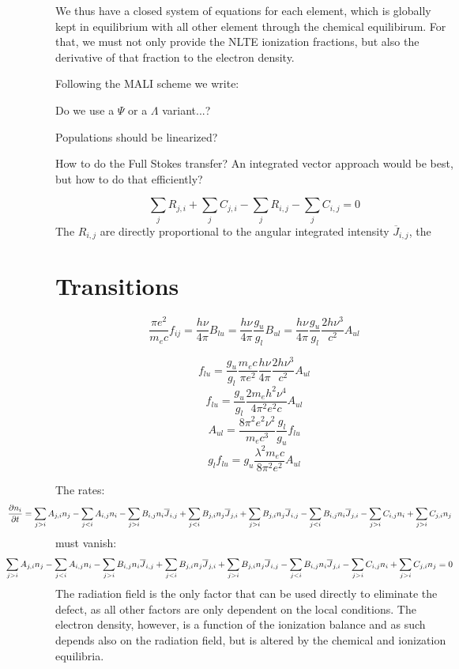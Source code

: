 \documentclass[a4paper]{article}
\begin{document}
We thus have a closed system of equations for each element, which is globally kept in equilibrium with all other element through the chemical equilibirum. For that, we must not only provide the NLTE ionization fractions, but also the derivative of that fraction to the electron density.

Following the MALI scheme we write:

Do we use a $\Psi$ or a $\Lambda$ variant...?

Populations should be linearized?

How to do the Full Stokes transfer? An integrated vector approach would be best, but how to do that efficiently?

$$
\sum_j R_{j,i} + \sum_j C_{j,i} - \sum_j R_{i,j} - \sum_j C_{i,j}=0
$$
The $R_{i,j}$ are directly proportional to the angular integrated intensity $\overline{J}_{i,j}$, the 

\section{Transitions}

$$
\frac{\pi e^2}{m_e c} f_{ij}=\frac{h\nu}{4\pi} B_{lu} = \frac{h\nu}{4\pi} \frac{g_u}{g_l}B_{ul} = \frac{h\nu}{4\pi} \frac{g_u}{g_l}  \frac{2 h\nu^3}{c^2} A_{ul} 
$$

$$
 f_{lu} =  \frac{g_u}{g_l} \frac{m_e c}{\pi e^2} \frac{h\nu}{4\pi} \frac{2 h\nu^3}{c^2} A_{ul} 
$$
$$
 f_{lu} =  \frac{g_u}{g_l} \frac{2 m_e h^2\nu^4}{4\pi^2 e^2 c} A_{ul} 
$$
$$
 A_{ul} =  \frac{8\pi^2 e^2 \nu^2}{m_e c^3} \frac{g_l}{g_u} f_{lu} 
$$
$$
 g_l f_{lu}  = g_u \frac{\lambda^2 m_e c}{8\pi^2 e^2} A_{ul}
$$

The rates:
$$
\hspace*{-2.00cm}\frac{\partial n_i}{\partial t}=\sum_{j > i} A_{j,i} n_j - \sum_{j < i} A_{i,j} n_i 
                              - \sum_{j > i} B_{i,j} n_i \overline{J}_{i,j} 
                              + \sum_{j < i} B_{j,i} n_j \overline{J}_{j,i} 
                              + \sum_{j > i} B_{j,i} n_j \overline{J}_{i,j} 
                              - \sum_{j < i} B_{i,j} n_i \overline{J}_{j,i} 
                              - \sum_{j > i} C_{i,j} n_i + \sum_{j > i} C_{j,i} n_j
$$
must vanish:
$$
\hspace*{-2.00cm}\sum_{j > i} A_{j,i} n_j - \sum_{j < i} A_{i,j} n_i 
                              - \sum_{j > i} B_{i,j} n_i \overline{J}_{i,j} 
                              + \sum_{j < i} B_{j,i} n_j \overline{J}_{j,i} 
                              + \sum_{j > i} B_{j,i} n_j \overline{J}_{i,j} 
                              - \sum_{j < i} B_{i,j} n_i \overline{J}_{j,i} 
                              - \sum_{j > i} C_{i,j} n_i + \sum_{j > i} C_{j,i} n_j = 0
$$
The radiation field is the only factor that can be used directly to eliminate the defect, as all other factors are only dependent on the local conditions. The electron density, however, is a function of the ionization balance and as such depends also on the radiation field, but is altered by the chemical and ionization equilibria.
\end{document}
